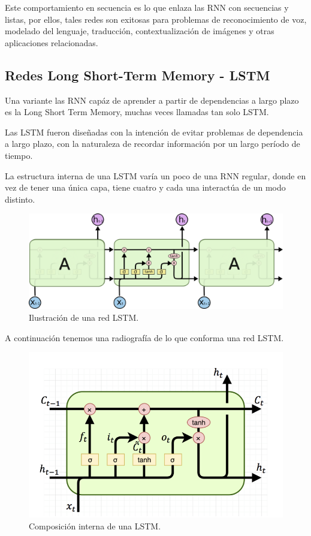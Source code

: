 \documentclass[12pt, letterpaper]{article}
\begin{document}
    Este comportamiento en secuencia es lo que enlaza las RNN con secuencias y listas, por ellos, tales redes son exitosas para problemas de reconocimiento de voz, modelado del lenguaje, traducción, contextualización de imágenes y otras aplicaciones relacionadas\cite{rnn-effectiveness}.

    \subsection{Redes Long Short-Term Memory - LSTM}
    Una variante las RNN capáz de aprender a partir de dependencias a largo plazo es la Long Short Term Memory, muchas veces llamadas tan solo LSTM.
    
    Las LSTM fueron diseñadas con la intención de evitar problemas de dependencia a largo plazo, con la naturaleza de recordar información por un largo período de tiempo.
    
    La estructura interna de una LSTM varía un poco de una RNN regular, donde en vez de tener una única capa, tiene cuatro y cada una interactúa de un modo distinto.

        \begin{figure}[H]
            \centering
            \includegraphics[width=\linewidth]{img/LSTM3-chain.png}
            \caption{Ilustración de una red LSTM.}
        \end{figure}

        A continuación tenemos una radiografía de lo que conforma una red LSTM.
        \begin{figure}[H]
            \centering
            \includegraphics[width=\linewidth]{img/LSTM3-cell-A.png}
            \caption{Composición interna de una LSTM.}
        \end{figure}
\end{document}
